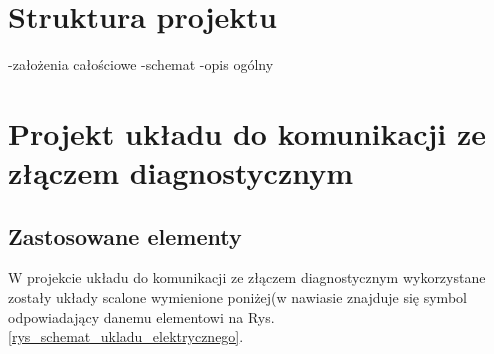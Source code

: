 \documentclass[12pt]{article} %
\numberwithin{equation}{subsection}
\numberwithin{figure}{section}
\numberwithin{table}{section}
\begin{document}
\section{Struktura projektu}
	\hspace{0.5cm}
	-założenia całościowe
	-schemat
	-opis ogólny	
	
	\newpage	
	
\section{Projekt układu do komunikacji ze złączem diagnostycznym}
	\subsection{Zastosowane elementy}W projekcie układu do komunikacji ze złączem diagnostycznym wykorzystane zostały układy scalone wymienione poniżej(w nawiasie znajduje się symbol odpowiadający danemu elementowi na Rys. \ref{rys_schemat_ukladu_elektrycznego}.
	
\end{document}
